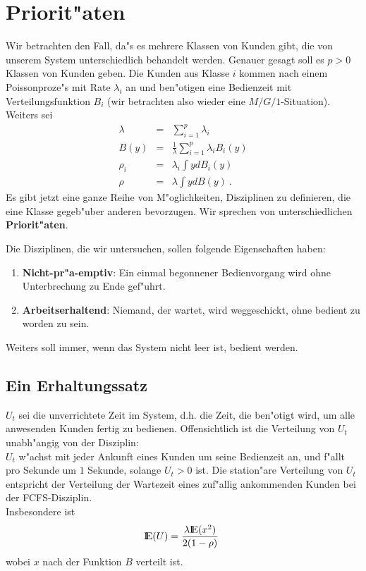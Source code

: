 \chapter{Priorit"aten}
Wir betrachten den Fall, da"s es mehrere Klassen von Kunden gibt, die von unserem System unterschiedlich behandelt werden. Genauer gesagt soll es
$p > 0$ Klassen
von Kunden geben. Die Kunden aus Klasse $i$ kommen nach einem Poissonproze"s mit Rate $\lambda_{i}$ an und ben"otigen eine Bedienzeit mit Verteilungsfunktion
$B_{i}$ (wir betrachten also wieder eine $M/G/1$-Situation). Weiters sei
\begin{eqnarray*}
\lambda &=& \sum_{i=1}^{p}\lambda _{i} \\
B(y) &=& \frac{1}{\lambda}\sum_{i=1}^{p}\lambda _{i}B_{i}(y) \\
\rho _{i} &=& \lambda _{i}\int ydB_{i}(y) \\
\rho &=& \lambda \int ydB(y) ~.
\end{eqnarray*}
Es gibt jetzt eine ganze Reihe von M"oglichkeiten, Disziplinen zu definieren, die eine Klasse gegeb"uber anderen bevorzugen. Wir sprechen von unterschiedlichen
{\bf {}Priorit"aten}.

Die Disziplinen, die wir untersuchen, sollen folgende Eigenschaften haben:
\begin{enumerate}
\item {\bf Nicht-pr"a-emptiv}: Ein einmal begonnener Bedienvorgang wird ohne Unterbrechung zu Ende gef"uhrt.
\item {\bf Arbeitserhaltend}: Niemand, der wartet, wird weggeschickt, ohne bedient zu worden zu sein.
\end{enumerate}
Weiters soll immer, wenn das System nicht leer ist, bedient werden.

\section{Ein Erhaltungssatz}

$U_{t}$ sei die unverrichtete Zeit im System, d.h. die Zeit, die ben"otigt wird, um alle anwesenden Kunden fertig zu bedienen. Offensichtlich ist die Verteilung
von $U_{t}$  unabh"angig von der Disziplin:  \\
$U_{t}$ w"achst mit jeder Ankunft eines Kunden um seine Bedienzeit an, und f"allt pro Sekunde um $1$ Sekunde, solange $U_{t}>0$ ist. Die station"are Verteilung
von $U_{t}$ entspricht der Verteilung der Wartezeit eines zuf"allig ankommenden Kunden bei der FCFS-Disziplin. \\
Insbesondere ist
\[{\rm I\kern-0.2em E}(U) = \frac{\lambda {\rm I\kern-0.2em E}(x^{2})}{2(1-\rho)} ~  \]
wobei $x$ nach der Funktion $B$ verteilt ist.

